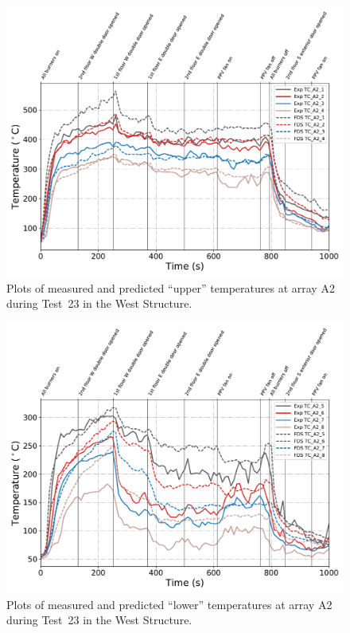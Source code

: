 \begin{figure}[!h]
	\centering
	\includegraphics[width=\columnwidth]{Figures/Plots/Validation/Temperature/Test_23_TC_A2_upper}
	\caption{Plots of measured and predicted ``upper'' temperatures at array A2 during Test~23 in the West Structure.}
	\label{fig:TCA2_upper_data_Test23}
\end{figure}

\begin{figure}[!h]
	\centering
	\includegraphics[width=\columnwidth]{Figures/Plots/Validation/Temperature/Test_23_TC_A2_lower}
	\caption{Plots of measured and predicted ``lower'' temperatures at array A2 during Test~23 in the West Structure.}
	\label{fig:TCA2_lower_data_Test23}
\end{figure}

